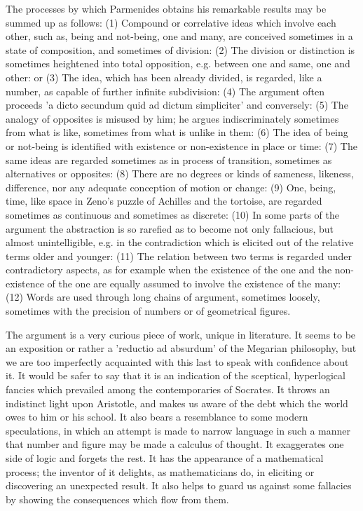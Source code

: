 The processes by which Parmenides obtains his remarkable results may be
summed up as follows: (1) Compound or correlative ideas which involve
each other, such as, being and not-being, one and many, are conceived
sometimes in a state of composition, and sometimes of division: (2) The
division or distinction is sometimes heightened into total opposition,
e.g. between one and same, one and other: or (3) The idea, which has
been already divided, is regarded, like a number, as capable of further
infinite subdivision: (4) The argument often proceeds 'a dicto secundum
quid ad dictum simpliciter' and conversely: (5) The analogy of opposites
is misused by him; he argues indiscriminately sometimes from what is
like, sometimes from what is unlike in them: (6) The idea of being or
not-being is identified with existence or non-existence in place
or time: (7) The same ideas are regarded sometimes as in process of
transition, sometimes as alternatives or opposites: (8) There are no
degrees or kinds of sameness, likeness, difference, nor any adequate
conception of motion or change: (9) One, being, time, like space in
Zeno's puzzle of Achilles and the tortoise, are regarded sometimes as
continuous and sometimes as discrete: (10) In some parts of the argument
the abstraction is so rarefied as to become not only fallacious, but
almost unintelligible, e.g. in the contradiction which is elicited out
of the relative terms older and younger: (11) The relation between two
terms is regarded under contradictory aspects, as for example when
the existence of the one and the non-existence of the one are equally
assumed to involve the existence of the many: (12) Words are used
through long chains of argument, sometimes loosely, sometimes with the
precision of numbers or of geometrical figures.

The argument is a very curious piece of work, unique in literature.
It seems to be an exposition or rather a 'reductio ad absurdum' of the
Megarian philosophy, but we are too imperfectly acquainted with this
last to speak with confidence about it. It would be safer to say that it
is an indication of the sceptical, hyperlogical fancies which prevailed
among the contemporaries of Socrates. It throws an indistinct light upon
Aristotle, and makes us aware of the debt which the world owes to him or
his school. It also bears a resemblance to some modern speculations, in
which an attempt is made to narrow language in such a manner that number
and figure may be made a calculus of thought. It exaggerates one side
of logic and forgets the rest. It has the appearance of a mathematical
process; the inventor of it delights, as mathematicians do, in eliciting
or discovering an unexpected result. It also helps to guard us against
some fallacies by showing the consequences which flow from them.

